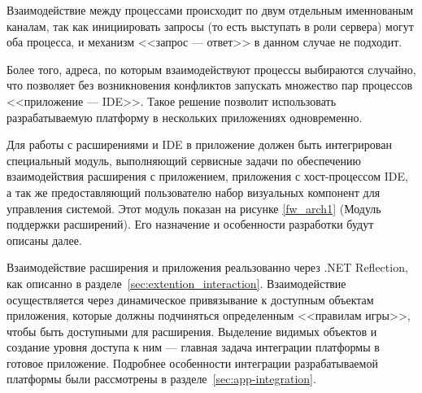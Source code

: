 Взаимодействие между процессами происходит по двум отдельным именнованым каналам, так как инициировать запросы (то есть выступать в роли сервера) могут оба процесса, и механизм <<запрос --- ответ>> в данном случае не подходит.

Более того, адреса, по которым взаимодействуют процессы выбираются случайно, что позволяет без возникновения конфликтов запускать множество пар процессов <<приложение --- IDE>>. Такое решение позволит использовать разрабатываемую платформу в нескольких приложениях одновременно.

Для работы с расширениями и IDE в приложение должен быть интегрирован специальный модуль, выполняющий сервисные задачи по обеспечению взаимодействия расширения с приложением, приложения с хост-процессом IDE, а так же предоставляющий пользователю набор визуальных компонент для управления системой. Этот модуль показан на рисунке \ref{fw_arch1} (Модуль поддержки расширений). Его назначение и особенности разработки будут описаны далее.

Взаимодействие расширения и приложения реальзованно через .NET Reflection, как описанно в разделе~\ref{sec:extention_interaction}. Взаимодействие осуществляется через динамическое привязывание к доступным объектам приложения, которые должны подчиняться определенным <<правилам игры>>, чтобы быть доступными для расширения. Выделение видимых объектов и создание уровня доступа к ним --- главная задача интеграции платформы в готовое приложение. Подробнее особенности интеграции разрабатываемой платформы были рассмотрены в разделе~\ref{sec:app-integration}.